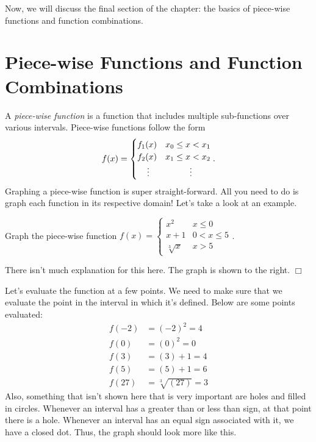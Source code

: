 \documentclass[lang=en,11pt]{elegantbook}
\begin{document}
Now, we will discuss the final section of the chapter: the basics of piece-wise functions and function combinations.
\section{Piece-wise Functions and Function Combinations}
\noindent A \textit{piece-wise function} is a function that includes multiple sub-functions over various intervals.  Piece-wise functions follow the form $$f(x)=\begin{cases} f_1(x) & x_0\leq x<x_1 \\ f_2(x) & x_1\leq x<x_2 \\ \hspace{4mm}\vdots & \hspace{10mm}\vdots \end{cases}.$$
Graphing a piece-wise function is super straight-forward.  All you need to do is graph each function in its respective domain!  Let's take a look at an example.
\begin{example}
Graph the piece-wise function $f(x)=\begin{cases} x^2 & x \leq 0 \\ x+1 & 0 < x \leq 5 \\ \sqrt[3]{x} & x > 5 \end{cases}$.
\end{example}

\begin{wrapfigure}{r}{4cm}
    \centering
\end{wrapfigure}

\begin{solution}
There isn't much explanation for this here.  The graph is shown to the right.  $\Box$
\end{solution}
Let's evaluate the function at a few points.  We need to make sure that we evaluate the point in the interval in which it's defined.  Below are some points evaluated: \begin{align*}
    f(-2)&= (-2)^2=4 \\
    f(0)&= (0)^2=0 \\
    f(3)&= (3)+1=4 \\
    f(5)&= (5)+1=6 \\
    f(27)&= \sqrt[3]{(27)}=3
\end{align*}
Also, something that isn't shown here that is very important are holes and filled in circles.  Whenever an interval has a greater than or less than sign, at that point there is a hole.  Whenever an interval has an equal sign associated with it, we have a closed dot.  Thus, the graph should look more like this.  
\end{document}
